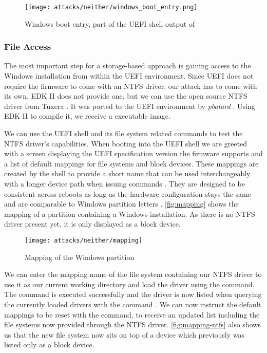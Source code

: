 \begin{figure}[htb]
    \centering
    \texttt{[image: attacks/neither/windows\_boot\_entry.png]}
    \caption{Windows boot entry, part of the \ac{UEFI} shell output of }
    \label{fig:windows-boot-entry}
\end{figure}

\subsubsection{File Access}

The most important step for a storage-based approach is gaining access to the Windows installation from within the \ac{UEFI} environment.
Since \ac{UEFI} does not require the firmware to come with an \ac{NTFS} driver, our attack has to come with its own.
\ac{EDK} II does not provide one, but we can use the open source \ac{NTFS} driver  from Tuxera \cite{ntfs-3g}.
It was ported to the \ac{UEFI} environment by \emph{pbatard} \cite{ntfs-3g-uefi}.
Using \ac{EDK} II to compile it, we receive a  executable image.

We can use the \ac{UEFI} shell and its file system related commands to test the \ac{NTFS} driver's capabilities.
When booting into the \ac{UEFI} shell we are greeted with a screen displaying the \ac{UEFI} specification version the firmware supports and a list of default mappings for file systems and block devices.
These mappings are created by the shell to provide a short name that can be used interchangeably with a longer device path when issuing commands \cite[Section 3.7.2]{uefi-shell-spec}.
They are designed to be consistent across reboots as long as the hardware configuration stays the same and are comparable to Windows partition letters \cite[Appendix A]{uefi-shell-spec}.
\autoref{fig:mapping} shows the mapping of a partition containing a Windows installation.
As there is no \ac{NTFS} driver present yet, it is only displayed as a block device.

\begin{figure}[htb]
    \centering
    \texttt{[image: attacks/neither/mapping]}
    \caption{Mapping of the Windows partition}
    \label{fig:mapping}
\end{figure}

We can enter the mapping name of the file system containing our \ac{NTFS} driver to use it as our current working directory and load the driver using the  command.
The command is executed successfully and the driver is now listed when querying the currently loaded drivers with the command .
We can now instruct the default mappings to be reset with the  command, to receive an updated list including the file systems now provided through the \ac{NTFS} driver.
\autoref{fig:mapping-ntfs} also shows us that the new file system now sits on top of a device which previously was listed only as a block device.

